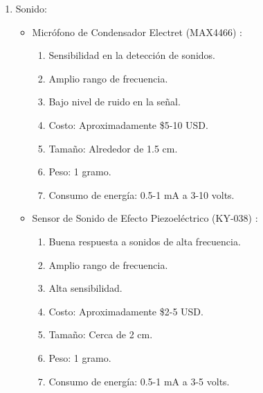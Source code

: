 \begin{enumerate}
\item Sonido:
\begin{itemize}
    \item Micrófono de Condensador Electret (MAX4466) \cite{88}:
\begin{enumerate}
        \item Sensibilidad en la detección de sonidos.
        \item Amplio rango de frecuencia.
        \item Bajo nivel de ruido en la señal.
        \item Costo: Aproximadamente \$5-10 USD.
        \item Tamaño: Alrededor de 1.5 cm.
        \item Peso: 1 gramo.
        \item Consumo de energía: 0.5-1 mA a 3-10 volts.
\end{enumerate}
    \item Sensor de Sonido de Efecto Piezoeléctrico (KY-038) \cite{89}:
\begin{enumerate}
        \item Buena respuesta a sonidos de alta frecuencia.
        \item Amplio rango de frecuencia.
        \item Alta sensibilidad.
        \item Costo: Aproximadamente \$2-5 USD.
        \item Tamaño: Cerca de 2 cm.
        \item Peso: 1 gramo.
        \item Consumo de energía: 0.5-1 mA a 3-5 volts.

\end{enumerate}
\end{itemize}


\end{enumerate}
